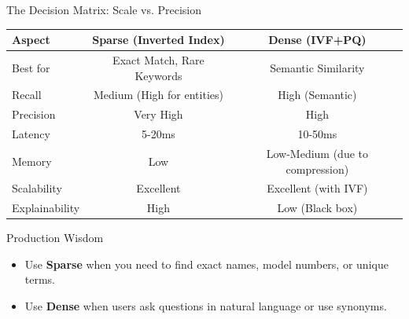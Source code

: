 \documentclass[aspectratio=169]{beamer}
\begin{document}
\begin{frame}{The Decision Matrix: Scale vs. Precision}
\begin{table}
\centering
\small
\begin{tabular}{lcc}
\toprule
\textbf{Aspect} & \textbf{Sparse (Inverted Index)} & \textbf{Dense (IVF+PQ)} \\
\midrule
Best for & Exact Match, Rare Keywords & Semantic Similarity \\
Recall & Medium (High for entities) & High (Semantic) \\
Precision & Very High & High \\
Latency & 5-20ms & 10-50ms \\
Memory & Low & Low-Medium (due to compression) \\
Scalability & Excellent & Excellent (with IVF) \\
Explainability & High & Low (Black box) \\
\bottomrule
\end{tabular}
\end{table}

\vspace{1em}

\begin{block}{Production Wisdom}
\begin{itemize}
    \item Use \textbf{Sparse} when you need to find exact names, model numbers, or unique terms.
    \item Use \textbf{Dense} when users ask questions in natural language or use synonyms.
\end{itemize}
\end{block}
\end{frame}

\end{document}
